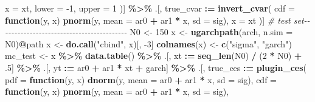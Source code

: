 \documentclass[
]{article}
\newenvironment{Shaded}{\begin{snugshade}}{\end{snugshade}}
\newcommand{\CommentTok}[1]{\textcolor[rgb]{0.56,0.35,0.01}{\textit{#1}}}
\newcommand{\ControlFlowTok}[1]{\textcolor[rgb]{0.13,0.29,0.53}{\textbf{#1}}}
\newcommand{\DataTypeTok}[1]{\textcolor[rgb]{0.13,0.29,0.53}{#1}}
\newcommand{\DecValTok}[1]{\textcolor[rgb]{0.00,0.00,0.81}{#1}}
\newcommand{\ErrorTok}[1]{\textcolor[rgb]{0.64,0.00,0.00}{\textbf{#1}}}
\newcommand{\FloatTok}[1]{\textcolor[rgb]{0.00,0.00,0.81}{#1}}
\newcommand{\KeywordTok}[1]{\textcolor[rgb]{0.13,0.29,0.53}{\textbf{#1}}}
\newcommand{\NormalTok}[1]{#1}
\newcommand{\OperatorTok}[1]{\textcolor[rgb]{0.81,0.36,0.00}{\textbf{#1}}}
\newcommand{\StringTok}[1]{\textcolor[rgb]{0.31,0.60,0.02}{#1}}
\theoremstyle{definition}
\theoremstyle{definition}
\theoremstyle{definition}
\theoremstyle{remark}
\begin{document}
\begin{Shaded}
\begin{Highlighting}[]
      \DataTypeTok{x =}\NormalTok{ xt,}
      \DataTypeTok{lower =} \DecValTok{{-}1}\NormalTok{,}
      \DataTypeTok{upper =} \DecValTok{1}
\NormalTok{    )] }\OperatorTok{\%>\%}\StringTok{ }
\StringTok{  }\NormalTok{.[,}
\NormalTok{    true\_cvar }\OperatorTok{:}\ErrorTok{=}\StringTok{ }\KeywordTok{invert\_cvar}\NormalTok{(}
      \DataTypeTok{cdf =} \ControlFlowTok{function}\NormalTok{(y, x) }\KeywordTok{pnorm}\NormalTok{(y, }\DataTypeTok{mean =}\NormalTok{ ar0 }\OperatorTok{+}\StringTok{ }\NormalTok{ar1 }\OperatorTok{*}\StringTok{ }\NormalTok{x, }\DataTypeTok{sd =}\NormalTok{ sig),}
      \DataTypeTok{x =}\NormalTok{ xt}
\NormalTok{    )]}
\CommentTok{\# test set{-}{-}{-}{-}{-}{-}{-}{-}{-}{-}{-}{-}{-}{-}{-}{-}{-}{-}{-}{-}{-}{-}{-}{-}{-}{-}{-}{-}{-}{-}{-}{-}{-}{-}{-}{-}{-}{-}{-}{-}{-}{-}}
\NormalTok{N0 <{-}}\StringTok{ }\DecValTok{150}
\NormalTok{x <{-}}\StringTok{ }\KeywordTok{ugarchpath}\NormalTok{(arch, }\DataTypeTok{n.sim =}\NormalTok{ N0)}\OperatorTok{@}\NormalTok{path}
\NormalTok{x <{-}}\StringTok{ }\KeywordTok{do.call}\NormalTok{(}\StringTok{"cbind"}\NormalTok{, x)[, }\DecValTok{{-}3}\NormalTok{]}
\KeywordTok{colnames}\NormalTok{(x) <{-}}\StringTok{ }\KeywordTok{c}\NormalTok{(}\StringTok{"sigma"}\NormalTok{, }\StringTok{"garch"}\NormalTok{)}
\NormalTok{mc\_test <{-}}\StringTok{ }
\StringTok{  }\NormalTok{x }\OperatorTok{\%>\%}\StringTok{ }
\StringTok{  }\KeywordTok{data.table}\NormalTok{() }\OperatorTok{\%>\%}\StringTok{ }
\StringTok{  }\NormalTok{.[,}
\NormalTok{    xt }\OperatorTok{:}\ErrorTok{=}\StringTok{ }\KeywordTok{seq\_len}\NormalTok{(N0) }\OperatorTok{/}\StringTok{ }\NormalTok{(}\DecValTok{2} \OperatorTok{*}\StringTok{ }\NormalTok{N0) }\OperatorTok{+}\StringTok{ }\FloatTok{.5}\NormalTok{] }\OperatorTok{\%>\%}\StringTok{ }
\StringTok{  }\NormalTok{.[,}
\NormalTok{    yt }\OperatorTok{:}\ErrorTok{=}\StringTok{ }\NormalTok{ar0 }\OperatorTok{+}\StringTok{ }\NormalTok{ar1 }\OperatorTok{*}\StringTok{ }\NormalTok{xt }\OperatorTok{+}\StringTok{ }\NormalTok{garch] }\OperatorTok{\%>\%}\StringTok{ }
\StringTok{  }\NormalTok{.[,}
\NormalTok{    true\_ces }\OperatorTok{:}\ErrorTok{=}\StringTok{ }\KeywordTok{plugin\_ces}\NormalTok{(}
      \DataTypeTok{pdf =} \ControlFlowTok{function}\NormalTok{(y, x) }\KeywordTok{dnorm}\NormalTok{(y, }\DataTypeTok{mean =}\NormalTok{ ar0 }\OperatorTok{+}\StringTok{ }\NormalTok{ar1 }\OperatorTok{*}\StringTok{ }\NormalTok{x, }\DataTypeTok{sd =}\NormalTok{ sig),}
      \DataTypeTok{cdf =} \ControlFlowTok{function}\NormalTok{(y, x) }\KeywordTok{pnorm}\NormalTok{(y, }\DataTypeTok{mean =}\NormalTok{ ar0 }\OperatorTok{+}\StringTok{ }\NormalTok{ar1 }\OperatorTok{*}\StringTok{ }\NormalTok{x, }\DataTypeTok{sd =}\NormalTok{ sig),}

\end{Highlighting}
\end{Shaded}
\end{document}
